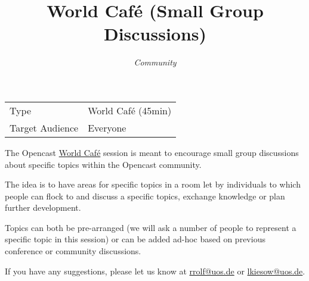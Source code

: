 \documentclass[a4paper]{article}
\title{World Café (Small Group Discussions)}
\author{\textit{Community}}
\begin{document}
\maketitle

\begin{center}
\begin{tabular}{ll}
\toprule
	Type            & World Café (45min) \\
	Target Audience & Everyone \\
\bottomrule
\end{tabular}
\end{center}

\vspace{1em}

The Opencast \href{https://en.wikipedia.org/wiki/World_caf%C3%A9}{World Café}
session is meant to encourage small group discussions about specific topics
within the Opencast community.

The idea is to have areas for specific topics in a room let by individuals to
which people can flock to and discuss a specific topics, exchange knowledge or
plan further development.

Topics can both be pre-arranged (we will ask a number of people to represent a
specific topic in this session) or can be added ad-hoc based on previous
conference or community discussions.

If you have any suggestions, please let us know at
\href{mailto:rrolf@uos.de}{rrolf@uos.de} or
\href{mailto:lkiesow@uos.de}{lkiesow@uos.de}.
\end{document}
